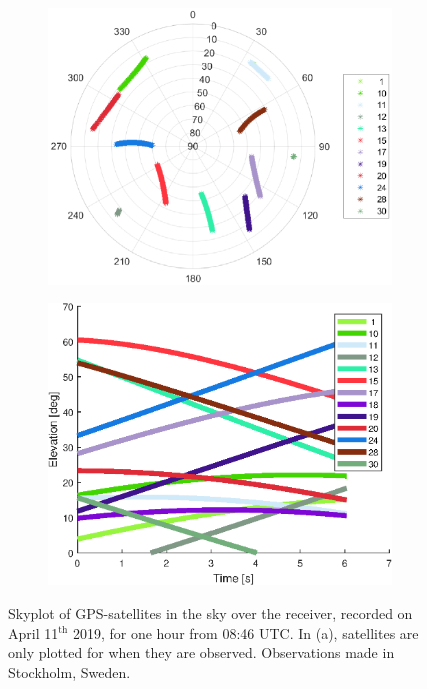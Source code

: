 \begin{figure}[h!]
\centering
\begin{subfigure}{0.8\textwidth}
\includegraphics[width=\textwidth]{Introduction/elAz}
\end{subfigure}
\begin{subfigure}{0.8\textwidth}
\includegraphics[width=\textwidth]{Introduction/elev}
\end{subfigure}
\caption{\label{fig:skyplot} Skyplot of GPS-satellites in the sky over the receiver, recorded on April 11$^{\text{th}}$ 2019, for one hour from 08:46 UTC. In (a), satellites are only plotted for when they are observed. Observations made in Stockholm, Sweden.}
\end{figure}



